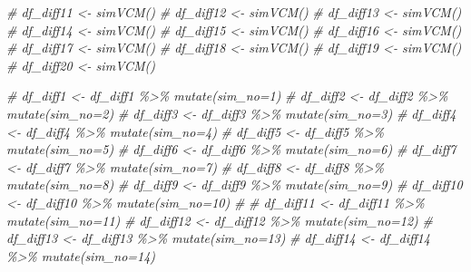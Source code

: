 \documentclass[
]{article}
\newenvironment{Shaded}{\begin{snugshade}}{\end{snugshade}}
\newcommand{\CommentTok}[1]{\textcolor[rgb]{0.56,0.35,0.01}{\textit{#1}}}
\begin{document}
\begin{Shaded}
\begin{Highlighting}[]
\CommentTok{\# df\_diff11 \textless{}{-} simVCM()}
\CommentTok{\# df\_diff12 \textless{}{-} simVCM()}
\CommentTok{\# df\_diff13 \textless{}{-} simVCM()}
\CommentTok{\# df\_diff14 \textless{}{-} simVCM()}
\CommentTok{\# df\_diff15 \textless{}{-} simVCM()}
\CommentTok{\# df\_diff16 \textless{}{-} simVCM()}
\CommentTok{\# df\_diff17 \textless{}{-} simVCM()}
\CommentTok{\# df\_diff18 \textless{}{-} simVCM()}
\CommentTok{\# df\_diff19 \textless{}{-} simVCM()}
\CommentTok{\# df\_diff20 \textless{}{-} simVCM()}
\end{Highlighting}
\end{Shaded}

\begin{Shaded}
\begin{Highlighting}[]
\CommentTok{\# df\_diff1 \textless{}{-} df\_diff1 \%\textgreater{}\% mutate(sim\_no=\textquotesingle{}1\textquotesingle{})}
\CommentTok{\# df\_diff2 \textless{}{-} df\_diff2 \%\textgreater{}\% mutate(sim\_no=\textquotesingle{}2\textquotesingle{})}
\CommentTok{\# df\_diff3 \textless{}{-} df\_diff3 \%\textgreater{}\% mutate(sim\_no=\textquotesingle{}3\textquotesingle{})}
\CommentTok{\# df\_diff4 \textless{}{-} df\_diff4 \%\textgreater{}\% mutate(sim\_no=\textquotesingle{}4\textquotesingle{})}
\CommentTok{\# df\_diff5 \textless{}{-} df\_diff5 \%\textgreater{}\% mutate(sim\_no=\textquotesingle{}5\textquotesingle{})}
\CommentTok{\# df\_diff6 \textless{}{-} df\_diff6 \%\textgreater{}\% mutate(sim\_no=\textquotesingle{}6\textquotesingle{})}
\CommentTok{\# df\_diff7 \textless{}{-} df\_diff7 \%\textgreater{}\% mutate(sim\_no=\textquotesingle{}7\textquotesingle{})}
\CommentTok{\# df\_diff8 \textless{}{-} df\_diff8 \%\textgreater{}\% mutate(sim\_no=\textquotesingle{}8\textquotesingle{})}
\CommentTok{\# df\_diff9 \textless{}{-} df\_diff9 \%\textgreater{}\% mutate(sim\_no=\textquotesingle{}9\textquotesingle{})}
\CommentTok{\# df\_diff10 \textless{}{-} df\_diff10 \%\textgreater{}\% mutate(sim\_no=\textquotesingle{}10\textquotesingle{})}
\CommentTok{\# }
\CommentTok{\# df\_diff11 \textless{}{-} df\_diff11 \%\textgreater{}\% mutate(sim\_no=\textquotesingle{}11\textquotesingle{})}
\CommentTok{\# df\_diff12 \textless{}{-} df\_diff12 \%\textgreater{}\% mutate(sim\_no=\textquotesingle{}12\textquotesingle{})}
\CommentTok{\# df\_diff13 \textless{}{-} df\_diff13 \%\textgreater{}\% mutate(sim\_no=\textquotesingle{}13\textquotesingle{})}
\CommentTok{\# df\_diff14 \textless{}{-} df\_diff14 \%\textgreater{}\% mutate(sim\_no=\textquotesingle{}14\textquotesingle{})}

\end{Highlighting}
\end{Shaded}
\end{document}
